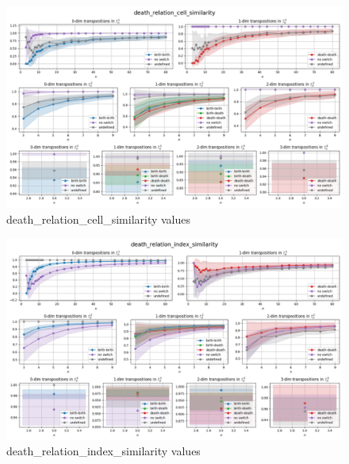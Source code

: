 \documentclass{article}
\begin{document}
\begin{figure}[h!]
    \hspace*{-3cm}
    \centering
    \includegraphics[width=1.5\textwidth]{pics/torus-transpositions/similaritites/score=death-relation-cell-similarity.png}
    \caption{death\_relation\_cell\_similarity values}
    \label{fig:death-relation-cell-similarity}
\end{figure}
\begin{figure}[h!]
    \hspace*{-3cm}
    \centering
    \includegraphics[width=1.5\textwidth]{pics/torus-transpositions/similaritites/score=death-relation-index-similarity.png}
    \caption{death\_relation\_index\_similarity values}
    \label{fig:death-relation-index-similarity}
\end{figure}
\end{document}
